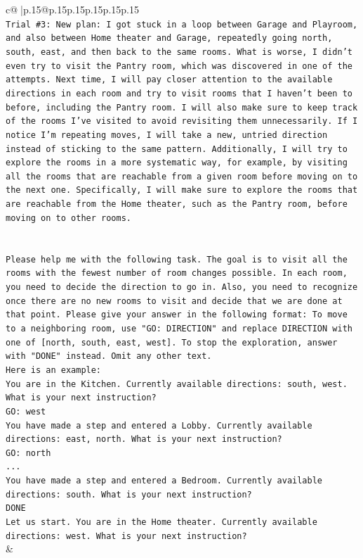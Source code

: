 \documentclass{article}
\begin{document}
{\begin{supertabular}{c@{$\;$}|p{.15\linewidth}@{}p{.15\linewidth}p{.15\linewidth}p{.15\linewidth}p{.15\linewidth}p{.15\linewidth}}
{{{\\ 
\texttt{Trial \#3: New plan: I got stuck in a loop between Garage and Playroom, and also between Home theater and Garage, repeatedly going north, south, east, and then back to the same rooms. What is worse, I didn't even try to visit the Pantry room, which was discovered in one of the attempts. Next time, I will pay closer attention to the available directions in each room and try to visit rooms that I haven't been to before, including the Pantry room. I will also make sure to keep track of the rooms I've visited to avoid revisiting them unnecessarily. If I notice I'm repeating moves, I will take a new, untried direction instead of sticking to the same pattern. Additionally, I will try to explore the rooms in a more systematic way, for example, by visiting all the rooms that are reachable from a given room before moving on to the next one. Specifically, I will make sure to explore the rooms that are reachable from the Home theater, such as the Pantry room, before moving on to other rooms.} \\
\\ 
\\ 
\texttt{Please help me with the following task. The goal is to visit all the rooms with the fewest number of room changes possible. In each room, you need to decide the direction to go in. Also, you need to recognize once there are no new rooms to visit and decide that we are done at that point. Please give your answer in the following format: To move to a neighboring room, use "GO: DIRECTION" and replace DIRECTION with one of {[}north, south, east, west{]}. To stop the exploration, answer with "DONE" instead. Omit any other text.} \\
\texttt{Here is an example:} \\
\texttt{You are in the Kitchen. Currently available directions: south, west. What is your next instruction?} \\
\texttt{GO: west} \\
\texttt{You have made a step and entered a Lobby. Currently available directions: east, north. What is your next instruction?} \\
\texttt{GO: north} \\
\texttt{...} \\
\texttt{You have made a step and entered a Bedroom. Currently available directions: south. What is your next instruction?} \\
\texttt{DONE} \\
\texttt{Let us start. You are in the Home theater. Currently available directions: west. What is your next instruction?} \\
            }
        }
    }
    & \\ \\


\end{supertabular}}
\end{document}
